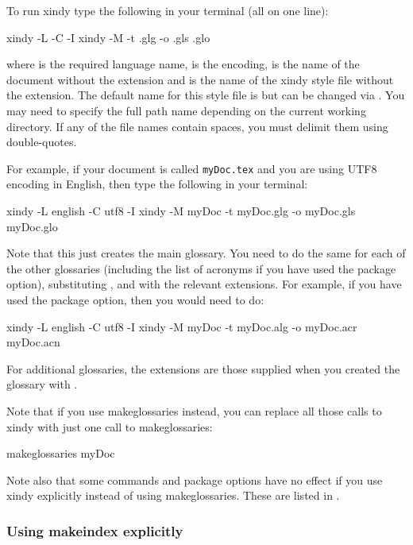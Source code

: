 \documentclass{nlctdoc}
\begin{document}
To run \gls{xindy} type the following in your terminal 
(all on one line):
\begin{prompt}
xindy -L  -C  -I xindy -M  -t .glg -o .gls .glo
\end{prompt}
where  is the required language name, 
is the encoding,  is the name of the document without the
 extension and  is the name of the
\gls{xindy} style file without the  extension.
The default name for this style file is 
but can be changed via . You may need
to specify the full path name depending on the current working
directory. If any of the file names contain spaces, you must delimit
them using double-quotes.

For example, if your document is called \texttt{myDoc.tex} and
you are using UTF8 encoding in English, then type the
following in your terminal:
\begin{prompt}
xindy -L english -C utf8 -I xindy -M myDoc -t myDoc.glg -o myDoc.gls myDoc.glo
\end{prompt}

Note that this just creates the main glossary. You need to do
the same for each of the other glossaries (including the
list of acronyms if you have used the 
package option), substituting , 
and  with the relevant extensions. For example,
if you have used the  package option, then 
you would need to do:
\begin{prompt}
xindy -L english -C utf8 -I xindy -M myDoc -t myDoc.alg -o myDoc.acr myDoc.acn
\end{prompt}
For additional glossaries, the extensions are those supplied
when you created the glossary with .

Note that if you use \gls{makeglossaries} instead, you can
replace all those calls to \gls{xindy} with just one call
to \gls*{makeglossaries}:
\begin{prompt}
makeglossaries myDoc
\end{prompt}
Note also that some commands and package options have no effect if 
you use \gls{xindy} explicitly instead of using 
\gls*{makeglossaries}. These are listed in 
.


\subsubsection{Using makeindex explicitly}
\label{sec:makeindexapp}
\end{document}
